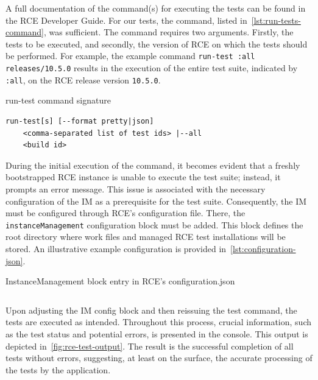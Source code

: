 A full documentation of the command(s) for executing the tests can be found in the \ac{RCE} Developer Guide. For our tests, the command, listed in~\cref{lst:run-tests-command}, was sufficient. The command requires two arguments. Firstly, the tests to be executed, and secondly, the version of \ac{RCE} on which the tests should be performed. For example, the example command \texttt{run-test :all releases/10.5.0} results in the execution of the entire test suite, indicated by \texttt{:all}, on the \ac{RCE} release version \texttt{10.5.0}.

\begin{listing}[ht]
\caption{run-test command signature}
\label{lst:run-tests-command}
\begin{verbatim}
run-test[s] [--format pretty|json] 
    <comma-separated list of test ids> |--all
    <build id>
\end{verbatim}
\end{listing}


During the initial execution of the command, it becomes evident that a freshly bootstrapped \ac{RCE} instance is unable to execute the test suite; instead, it prompts an error message. This issue is associated with the necessary configuration of the \ac{IM} as a prerequisite for the test suite. Consequently, the \ac{IM} must be configured through \ac{RCE}'s configuration file. There, the \texttt{instanceManagement} configuration block must be added. This block defines the root directory where work files and managed RCE test installations will be stored. An illustrative example configuration is provided in~\cref{lst:configuration-json}.

\begin{listing}
\caption{InstanceManagement block entry in \ac{RCE}'s configuration.json}
\label{lst:configuration-json}
\inputminted{json}{files/code/configuration.json}
\end{listing}

Upon adjusting the \ac{IM} config block and then reissuing the test command, the tests are executed as intended. Throughout this process, crucial information, such as the test status and potential errors, is presented in the console. This output is depicted in~\cref{fig:rce-test-output}. The result is the successful completion of all tests without errors, suggesting, at least on the surface, the accurate processing of the tests by the application.


